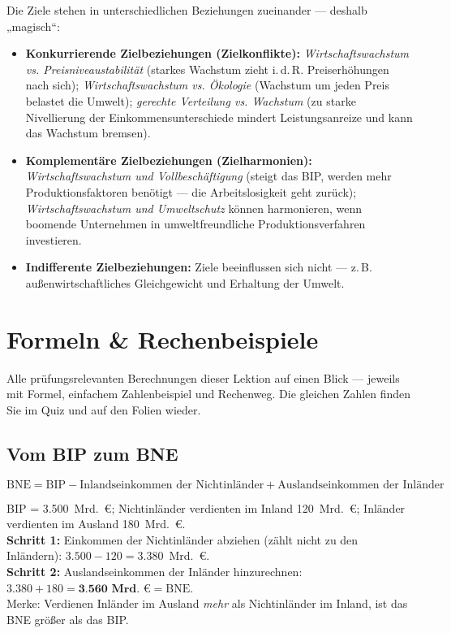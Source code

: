 \documentclass[11pt, a4paper]{article}
\begin{document}
Die Ziele stehen in unterschiedlichen Beziehungen zueinander --- deshalb „magisch``:

\begin{itemize}
  \item \textbf{Konkurrierende Zielbeziehungen (Zielkonflikte):}
    \emph{Wirtschaftswachstum vs. Preisniveaustabilität} (starkes Wachstum zieht i.\,d.\,R.
    Preiserhöhungen nach sich); \emph{Wirtschaftswachstum vs. Ökologie} (Wachstum um jeden
    Preis belastet die Umwelt); \emph{gerechte Verteilung vs. Wachstum} (zu starke
    Nivellierung der Einkommensunterschiede mindert Leistungsanreize und kann das
    Wachstum bremsen).
  \item \textbf{Komplementäre Zielbeziehungen (Zielharmonien):}
    \emph{Wirtschaftswachstum und Vollbeschäftigung} (steigt das BIP, werden mehr
    Produktionsfaktoren benötigt --- die Arbeitslosigkeit geht zurück);
    \emph{Wirtschaftswachstum und Umweltschutz} können harmonieren, wenn boomende
    Unternehmen in umweltfreundliche Produktionsverfahren investieren.
  \item \textbf{Indifferente Zielbeziehungen:} Ziele beeinflussen sich nicht ---
    z.\,B. außenwirtschaftliches Gleichgewicht und Erhaltung der Umwelt.
\end{itemize}

\section{Formeln \& Rechenbeispiele}

Alle prüfungsrelevanten Berechnungen dieser Lektion auf einen Blick --- jeweils mit
Formel, einfachem Zahlenbeispiel und Rechenweg. Die gleichen Zahlen finden Sie im Quiz
und auf den Folien wieder.

\subsection{Vom BIP zum BNE}

\begin{merksatz}[title={\bfseries Formel: BIP $\rightarrow$ BNE}]
\[
\text{BNE} = \text{BIP} - \text{Inlandseinkommen der Nichtinländer}
+ \text{Auslandseinkommen der Inländer}
\]
\end{merksatz}

\begin{beispiel}
BIP = 3.500~Mrd.~€; Nichtinländer verdienten im Inland 120~Mrd.~€; Inländer verdienten
im Ausland 180~Mrd.~€.\\[0.3em]
\textbf{Schritt 1:} Einkommen der Nichtinländer abziehen (zählt nicht zu den Inländern):
$3.500 - 120 = 3.380$~Mrd.~€.\\
\textbf{Schritt 2:} Auslandseinkommen der Inländer hinzurechnen:
$3.380 + 180 = \textbf{3.560~Mrd.~€} = \text{BNE}$.\\[0.3em]
Merke: Verdienen Inländer im Ausland \emph{mehr} als Nichtinländer im Inland, ist das
BNE größer als das BIP.
\end{beispiel}
\end{document}
